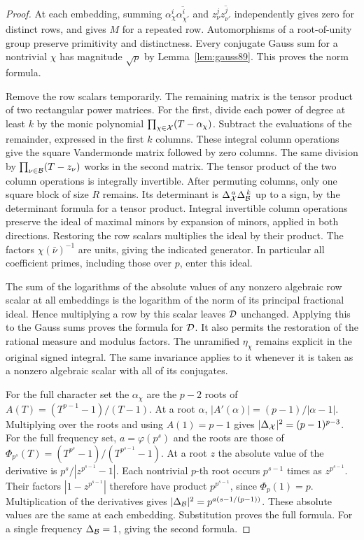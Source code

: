 \documentclass[a4paper,11pt]{article}
\theoremstyle{definition}
\theoremstyle{remark}
\numberwithin{equation}{section}
\begin{document}
\begin{proof}
At each embedding, summing \(\alpha_\chi^i\overline{\alpha_{\chi'}^i}\)
and \(z_\nu^j\overline{z_{\nu'}^j}\) independently gives zero
for distinct rows, and gives \(M\) for a repeated row. Automorphisms
of a root-of-unity group preserve primitivity and distinctness.
Every conjugate Gauss sum for a nontrivial \(\chi\) has magnitude
\(\sqrt p\) by Lemma~\ref{lem:gauss89}. This proves the norm formula.

Remove the row scalars temporarily. The remaining matrix is the
tensor product of two rectangular power matrices. For the first,
divide each power of degree at least \(k\) by the monic polynomial
\(\prod_{\chi\in{\cal X}}(T-\alpha_\chi)\). Subtract the evaluations
of the remainder, expressed in the first \(k\) columns. These
integral column operations give the square Vandermonde matrix
followed by zero columns. The same division by
\(\prod_{\nu\in{\cal B}}(T-z_\nu)\) works in the second matrix.
The tensor product of the two column operations is integrally
invertible. After permuting columns, only one square block of size
\(R\) remains. Its determinant is \(\Delta_{\cal X}^{\,a}
\Delta_{\cal B}^{\,k}\) up to a sign, by the determinant formula for
a tensor product. Integral invertible column operations preserve the
ideal of maximal minors by expansion of minors, applied in both
directions. Restoring the row scalars multiplies the ideal by their
product. The factors \(\chi(\bar\nu)^{-1}\) are units, giving
the indicated generator. In particular all coefficient primes,
including those over \(p\), enter this ideal.

The sum of the logarithms of the absolute values of any nonzero
algebraic row scalar at all embeddings is the logarithm of the norm
of its principal fractional ideal. Hence multiplying a row by this
scalar leaves \({\cal D}\) unchanged. Applying this to the Gauss
sums proves the formula for \({\cal D}\). It also permits the
restoration of the rational measure and modulus factors. The
unramified \(\eta_\chi\) remains explicit in the original signed
integral. The same invariance applies to it whenever it is taken
as a nonzero algebraic scalar with all of its conjugates.

For the full character set the \(\alpha_\chi\) are the \(p-2\)
roots of \(A(T)=(T^{p-1}-1)/(T-1)\). At a root \(\alpha\),
\(|A'(\alpha)|=(p-1)/|\alpha-1|\). Multiplying over the roots
and using \(A(1)=p-1\) gives
\(|\Delta_{\cal X}|^2=(p-1)^{p-3}\). For the full frequency set,
\(a=\varphi(p^s)\) and the roots are those of
\(\Phi_{p^s}(T)=(T^{p^s}-1)/(T^{p^{s-1}}-1)\).
At a root \(z\) the absolute value of the derivative is
\(p^s/|z^{p^{s-1}}-1|\). Each nontrivial \(p\)-th root occurs
\(p^{s-1}\) times as \(z^{p^{s-1}}\). Their factors \(|1-z^{p^{s-1}}|\)
therefore have product \(p^{p^{s-1}}\), since \(\Phi_p(1)=p\).
Multiplication of the derivatives gives
\(|\Delta_{\cal B}|^2=p^{a(s-1/(p-1))}\). These absolute values
are the same at each embedding. Substitution proves the full formula.
For a single frequency \(\Delta_{\cal B}=1\), giving the second
formula.
\end{proof}
\end{document}
